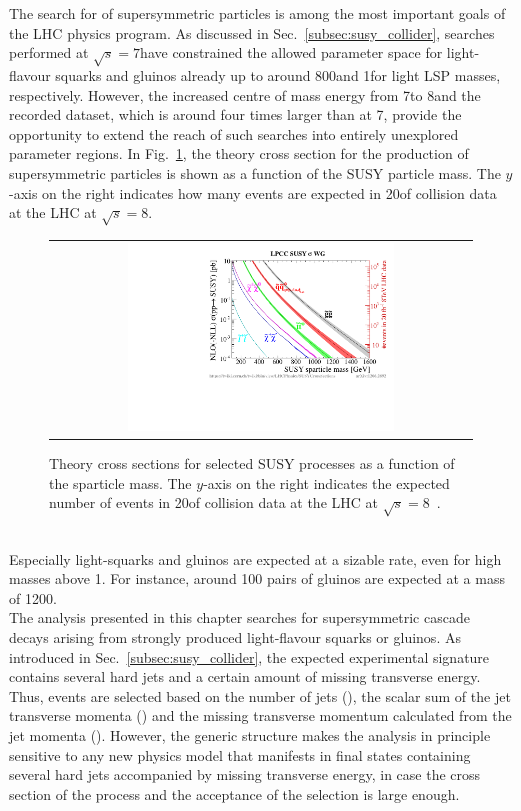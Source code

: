 The search for of supersymmetric particles is among the most important goals of the LHC physics program. As discussed in Sec.~\ref{subsec:susy_collider}, searches performed at $\sqrt{s} = 7$\tev have constrained the allowed parameter space for light-flavour squarks and gluinos already up to around 800\gev and 1\tev for light LSP masses, respectively. However, the increased centre of mass energy from 7\tev to 8\tev and the recorded dataset, which is around four times larger than at 7\tev, provide the opportunity to extend the reach of such searches into entirely unexplored parameter regions. In Fig.~\ref{fig:susy_theory_xs}, the theory cross section for the production of supersymmetric particles is shown as a function of the SUSY particle mass. The $y$-axis on the right indicates how many events are expected in 20\fbinv of \pp collision data at the LHC at $\sqrt{s}=8$\tev. 
\begin{figure}[!h]
  \centering
  \begin{tabular}{c}
                \includegraphics[width=0.65\textwidth]{figures/xsections_strong.pdf} 
  \end{tabular}
  \caption{Theory cross sections for selected SUSY processes as a function of the sparticle mass. The $y$-axis on the right indicates the expected number of events in 20\fbinv of \pp collision data at the LHC at $\sqrt{s}=8$\tev~\cite{Kramer:2012bx}.}
  \label{fig:susy_theory_xs}
\end{figure}
\\
Especially light-squarks and gluinos are expected at a sizable rate, even for high masses above 1\tev. For instance, around 100 pairs of gluinos are expected at a mass of 1200\gev. \\
The analysis presented in this chapter searches for supersymmetric cascade decays arising from strongly produced light-flavour squarks or gluinos. As introduced in Sec.~\ref{subsec:susy_collider}, the expected experimental signature contains several hard jets and a certain amount of missing transverse energy. Thus, events are selected based on the number of jets (\NJets), the scalar sum of the jet transverse momenta (\HT) and the missing transverse momentum calculated from the jet momenta (\MHT). However, the generic structure makes the analysis in principle sensitive to any new physics model that manifests in final states containing several hard jets accompanied by missing transverse energy, in case the cross section of the process and the acceptance of the selection is large enough. \\
